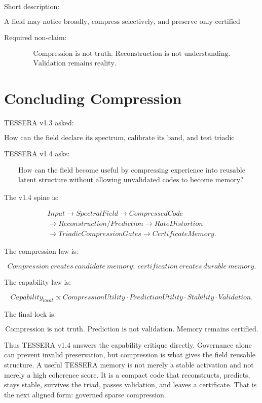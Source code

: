 \documentclass[12pt]{article}
\begin{document}
Short description:

\[
\boxed{
\text{A field may notice broadly, compress selectively, and preserve only certified codes.}
}
\]

Required non-claim:

\[
\boxed{\begin{gathered}
\text{Compression is not truth. Reconstruction is not understanding.}\\
\text{Validation remains reality.}
\end{gathered}}
\]

\section{Concluding Compression}

TESSERA v1.3 asked:

\[
\boxed{
\text{How can the field declare its spectrum, calibrate its band, and test triadic preservation?}
}
\]

TESSERA v1.4 asks:

\[
\boxed{
\begin{gathered}
\text{How can the field become useful by compressing experience into reusable}\\
\text{latent structure without allowing unvalidated codes to become memory?}
\end{gathered}
}
\]

The v1.4 spine is:

\[
\boxed{\begin{gathered}
Input\rightarrow SpectralField\rightarrow CompressedCode\\
\rightarrow Reconstruction/Prediction\rightarrow RateDistortion\\
\rightarrow TriadicCompressionGates\rightarrow CertificateMemory.
\end{gathered}}
\]

The compression law is:

\[
\boxed{
Compression\ creates\ candidate\ memory;\ certification\ creates\ durable\ memory.
}
\]

The capability law is:

\[
\boxed{
Capability_{local}
\propto
CompressionUtility\cdot PredictionUtility\cdot Stability\cdot Validation.
}
\]

The final lock is:

\[
\boxed{
\text{Compression is not truth. Prediction is not validation. Memory remains certified.}
}
\]

Thus TESSERA v1.4 answers the capability critique directly. Governance alone can
prevent invalid preservation, but compression is what gives the field reusable
structure. A useful TESSERA memory is not merely a stable activation and not
merely a high coherence score. It is a compact code that reconstructs, predicts,
stays stable, survives the triad, passes validation, and leaves a certificate.
That is the next aligned form: governed sparse compression.
\end{document}
